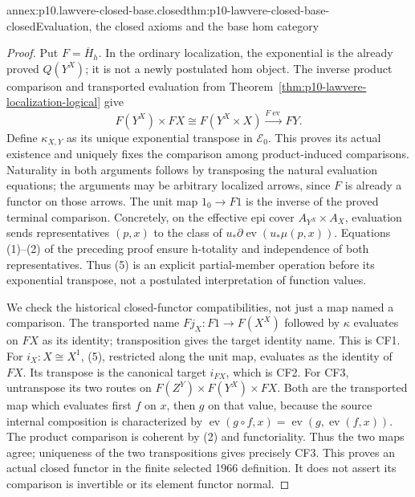 \begin{annexitem}{annex:p10.lawvere-closed-base.closed}{thm:p10-lawvere-closed-base-closed}{Evaluation, the closed axioms and the base hom category}
\begin{proof}
Put \(F=\overline H_h\). In the ordinary localization, the
exponential is the already proved \(Q(Y^X)\); it is not a newly
postulated hom object. The inverse product comparison and transported
evaluation from Theorem~\ref{thm:p10-lawvere-localization-logical} give
\[
 F(Y^X)\times FX\cong F(Y^X\times X)
                       \xrightarrow{F\operatorname{ev}}FY.
                                                               \tag{5}
\]
Define \(\kappa_{X,Y}\) as its unique exponential transpose in
\(\mathcal E_0\). This proves its actual existence and uniquely
fixes the comparison among product-induced comparisons. Naturality in
both arguments follows by transposing the natural evaluation equations;
the arguments may be arbitrary localized arrows, since \(F\) is
already a functor on those arrows. The unit map \(1_0\to F1\)
is the inverse of the proved terminal comparison.
Concretely, on the effective epi cover
\(A_{Y^X}\times A_X\), evaluation sends representatives \((p,x)\)
to the class of \(u_*\partial\operatorname{ev}(u_*\mu(p,x))\).
Equations (1)--(2) of the preceding proof ensure h-totality and
independence of both representatives. Thus (5) is an explicit
partial-member operation before its exponential transpose, not a
postulated interpretation of function values.

We check the historical closed-functor compatibilities, not just a
map named a comparison. The transported name \(Fj_X:F1\to F(X^X)\)
followed by \(\kappa\) evaluates on \(FX\) as its identity;
transposition gives the target identity name. This is CF1. For
\(i_X:X\cong X^1\), (5), restricted along the unit map, evaluates
as the identity of \(FX\). Its transpose is the canonical target
\(i_{FX}\), which is CF2. For CF3, untranspose its two routes
on
\(F(Z^Y)\times F(Y^X)\times FX\). Both are the transported
map which evaluates first \(f\) on \(x\), then \(g\) on that
value, because the source internal composition is characterized by
\(\operatorname{ev}(g\circ f,x)=\operatorname{ev}(g,
\operatorname{ev}(f,x))\). The product comparison is coherent by
(2) and functoriality. Thus the two maps agree; uniqueness of the
two transpositions gives precisely CF3. This proves an actual closed
functor in the finite selected 1966 definition. It does not assert its
comparison is invertible or its element functor normal.


\end{proof}
\end{annexitem}
